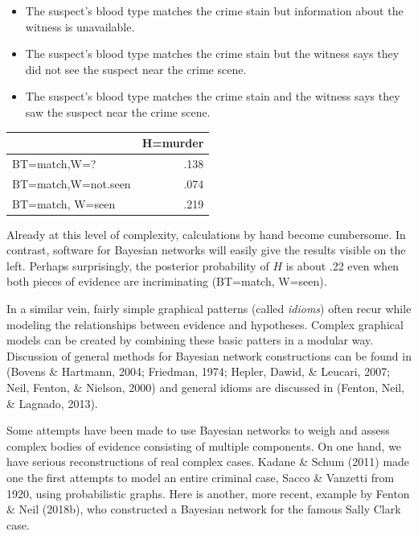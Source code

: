 \documentclass[11pt,dvipsnames,enabledeprecatedfontcommands]{scrartcl}
\begin{document}
\begin{itemize} 
\item The suspect's blood type matches the crime stain but  information about the witness is unavailable.
\item The suspect's blood type matches the crime stain but the witness says they did not see the suspect near the crime scene.
\item The suspect's blood type matches the crime stain and the witness says they saw the suspect near the crime scene.
\end{itemize}

\vspace{1mm}

\begin{minipage}[c]{0.4\linewidth}
\begin{tabular}{lr}
\toprule
  & H=murder\\
\midrule
BT=match,W=? & .138\\
BT=match,W=not.seen & .074\\
BT=match, W=seen & .219\\
\bottomrule
\end{tabular}
\end{minipage}
\begin{minipage}[c]{0.6\linewidth}
Already at this level of complexity, calculations by hand become cumbersome. In contrast,  software for Bayesian networks  will easily give the results visible on the left. Perhaps surprisingly, the posterior probability of $H$ is about .22 even when both pieces of evidence are incriminating (BT=match, W=seen).
\end{minipage}

\vspace{2mm}

In a similar vein, fairly simple graphical patterns (called
\emph{idioms}) often recur while modeling the relationships between
evidence and hypotheses. Complex graphical models can be created by
combining these basic patters in a modular way. Discussion of general
methods for Bayesian network constructions can be found in (Bovens \&
Hartmann, 2004; Friedman, 1974; Hepler, Dawid, \& Leucari, 2007; Neil,
Fenton, \& Nielson, 2000) and general idioms are discussed in (Fenton,
Neil, \& Lagnado, 2013).

Some attempts have been made to use Bayesian networks to weigh and
assess complex bodies of evidence consisting of multiple components. On
one hand, we have serious reconstructions of real complex cases. Kadane
\& Schum (2011) made one the first attempts to model an entire criminal
case, Sacco \& Vanzetti from 1920, using probabilistic graphs. Here is
another, more recent, example by Fenton \& Neil (2018b), who constructed
a Bayesian network for the famous Sally Clark case.
\end{document}

